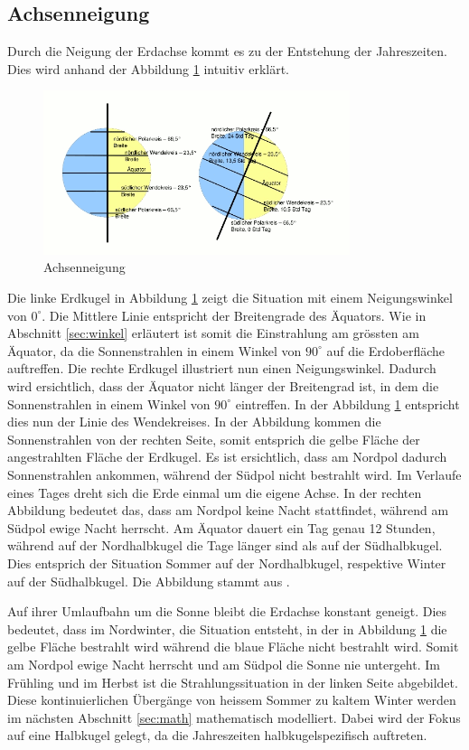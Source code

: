 \begin{refsection}
\section{Achsenneigung}\label{sec:neigung}
Durch die Neigung der Erdachse kommt es zu der Entstehung der Jahreszeiten. Dies wird anhand der Abbildung \ref{fig:abb6} intuitiv erklärt. 
%
\begin{figure}
	\centering
	\includegraphics[width= 0.8\textwidth]{neigung/tagundnacht.png}
	\caption[Achsenneigung]{Achsenneigung}
	\label{fig:abb6}
\end{figure}
%
Die linke Erdkugel in Abbildung \ref{fig:abb6} zeigt die Situation
mit einem Neigungswinkel von $0^\circ$. Die Mittlere Linie entspricht
der Breitengrade des Äquators. Wie in Abschnitt \ref{sec:winkel}
erläutert ist somit die Einstrahlung am grössten am Äquator, da die
Sonnenstrahlen in einem Winkel von $90^\circ$ auf die Erdoberfläche
auftreffen. Die rechte Erdkugel illustriert nun einen Neigungswinkel.
Dadurch wird ersichtlich, dass der Äquator nicht länger der Breitengrad
ist, in dem die Sonnenstrahlen in einem Winkel von $90^\circ$
eintreffen. In der Abbildung \ref{fig:abb6} entspricht dies nun der
Linie des Wendekreises. In der Abbildung kommen die Sonnenstrahlen
von der rechten Seite, somit entsprich die gelbe Fläche der
angestrahlten Fläche der Erdkugel. Es ist ersichtlich, dass am
Nordpol dadurch Sonnenstrahlen ankommen, während der Südpol nicht
bestrahlt wird. Im Verlaufe eines Tages dreht sich die Erde einmal
um die eigene Achse. In der rechten Abbildung bedeutet das, dass
am Nordpol keine Nacht stattfindet, während am Südpol ewige Nacht
herrscht. Am Äquator dauert ein Tag genau 12 Stunden, während auf
der Nordhalbkugel die Tage länger sind als auf der Südhalbkugel.
Dies entsprich der Situation Sommer auf der Nordhalbkugel, respektive
Winter auf der Südhalbkugel. Die Abbildung stammt aus \cite{fa}.

Auf ihrer Umlaufbahn um die Sonne bleibt die Erdachse konstant
geneigt. Dies bedeutet, dass im Nordwinter, die Situation entsteht,
in der in Abbildung \ref{fig:abb6} die gelbe Fläche bestrahlt wird
während die blaue Fläche nicht bestrahlt wird. Somit am Nordpol
ewige Nacht herrscht und am Südpol die Sonne nie untergeht. Im
Frühling und im Herbst ist die Strahlungssituation in der linken
Seite abgebildet. Diese kontinuierlichen Übergänge von heissem
Sommer zu kaltem Winter werden im nächsten Abschnitt \ref{sec:math}
mathematisch modelliert. Dabei wird der Fokus auf eine Halbkugel
gelegt, da die Jahreszeiten halbkugelspezifisch auftreten.


\end{refsection}
